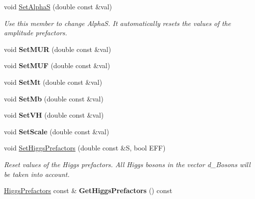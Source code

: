 \begin{DoxyCompactItemize}
\item 
\hypertarget{classHiggsModel_a5a3f7171856b2106141948544fc49f13}{void \hyperlink{classHiggsModel_a5a3f7171856b2106141948544fc49f13}{Set\-Alpha\-S} (double const \&val)}\label{classHiggsModel_a5a3f7171856b2106141948544fc49f13}

\begin{DoxyCompactList}\small\item\em Use this member to change Alpha\-S. It automatically resets the values of the amplitude prefactors. \end{DoxyCompactList}\item 
\hypertarget{classHiggsModel_a40b498b2555458a9abc4ea989e72ce91}{void {\bfseries Set\-M\-U\-R} (double const \&val)}\label{classHiggsModel_a40b498b2555458a9abc4ea989e72ce91}

\item 
\hypertarget{classHiggsModel_a8e8772814f7441352b226eb0566a263e}{void {\bfseries Set\-M\-U\-F} (double const \&val)}\label{classHiggsModel_a8e8772814f7441352b226eb0566a263e}

\item 
\hypertarget{classHiggsModel_a511bd13bf20268e59567b2049d7a5781}{void {\bfseries Set\-Mt} (double const \&val)}\label{classHiggsModel_a511bd13bf20268e59567b2049d7a5781}

\item 
\hypertarget{classHiggsModel_a460c285dbbd117c30be6ea43f5271e2d}{void {\bfseries Set\-Mb} (double const \&val)}\label{classHiggsModel_a460c285dbbd117c30be6ea43f5271e2d}

\item 
\hypertarget{classHiggsModel_a058daf0cc3b8cad4077419d19d8e4c21}{void {\bfseries Set\-V\-H} (double const \&val)}\label{classHiggsModel_a058daf0cc3b8cad4077419d19d8e4c21}

\item 
\hypertarget{classHiggsModel_aaca4ad2dcfd40c87e76fc88ab95b56dc}{void {\bfseries Set\-Scale} (double const \&val)}\label{classHiggsModel_aaca4ad2dcfd40c87e76fc88ab95b56dc}

\item 
void \hyperlink{classHiggsModel_a43f6951291eef31cc18116f7d49f839f}{Set\-Higgs\-Prefactors} (double const \&S, bool E\-F\-F)
\begin{DoxyCompactList}\small\item\em Reset values of the Higgs prefactors. All Higgs bosons in the vector d\-\_\-\-Bosons will be taken into account. \end{DoxyCompactList}\item 
\hypertarget{classHiggsModel_a36b052bac528028a1757554d45901513}{\hyperlink{structHiggsPrefactors}{Higgs\-Prefactors} const \& {\bfseries Get\-Higgs\-Prefactors} () const }\label{classHiggsModel_a36b052bac528028a1757554d45901513}


\end{DoxyCompactItemize}
